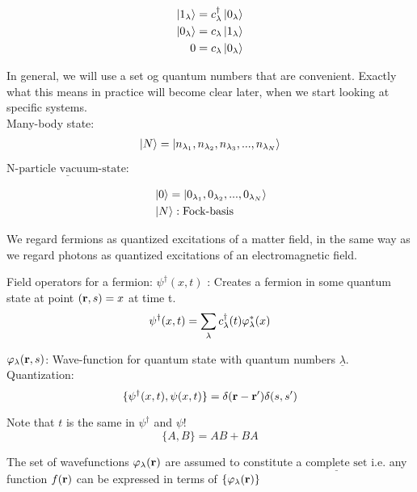 \begin{align*}
	\ket{1_\lambda} &= c^{\dagger}_\lambda \ket{0_\lambda}\\
	\ket{0_\lambda} &= c_\lambda \ket{1_\lambda}\\
	0 &= c_\lambda \ket{0_\lambda}
\end{align*}

\noindent In general, we will use a set og quantum numbers that are convenient. Exactly what this means in practice will become clear later, when we start looking at specific systems.\\

\noindent Many-body state:
\begin{align*}
	\ket{N}= \ket{ n_{\lambda_1}, n_{\lambda_2} ,n_{\lambda_3} ,...,  n_{\lambda_N}} 
\end{align*}

\noindent $\underline{\text{N-particle vacuum-state:}}$

\begin{align}
	&\ket{0} = \ket{0_{\lambda_1},0_{\lambda_2},...,0_{\lambda_N}}\\
	&\ket{N} : \text{Fock-basis} \nonumber
\end{align}

\noindent We regard fermions as quantized excitations of a matter field, in the same way as we regard photons as quantized excitations of an electromagnetic field.

Field operators for a fermion: $\psi^\dagger(x,t)$ : Creates a fermion in some quantum state at point $(\vb{r},s)=x$ at time t.
\begin{equation}
	\psi^\dagger(x,t)= \sum_\lambda c^{\dagger}_\lambda(t) \varphi_\lambda^*(x)
\end{equation}

\noindent $\varphi_\lambda(\vb{r},s)$: Wave-function for quantum state with quantum numbers $\underline{\lambda}$.\\

\noindent Quantization:
\begin{equation}
	\{\psi^\dagger (x,t), \psi(x,t) \}= \delta(\vb{r}-\vb{r'}) \delta(s,s')
\end{equation}

Note that $t$ is the same in $\psi^\dagger$ and $\psi$!
\begin{equation}
	\{A,B\}= AB+BA
\end{equation}

\noindent The set of wavefunctions $\varphi_\lambda(\vb{r})$ are assumed to constitute a $\underline{\text{complete set}}$ i.e. any function $f(\vb{r})$ can be expressed in terms of $\{\varphi_\lambda(\vb{r})\}$

